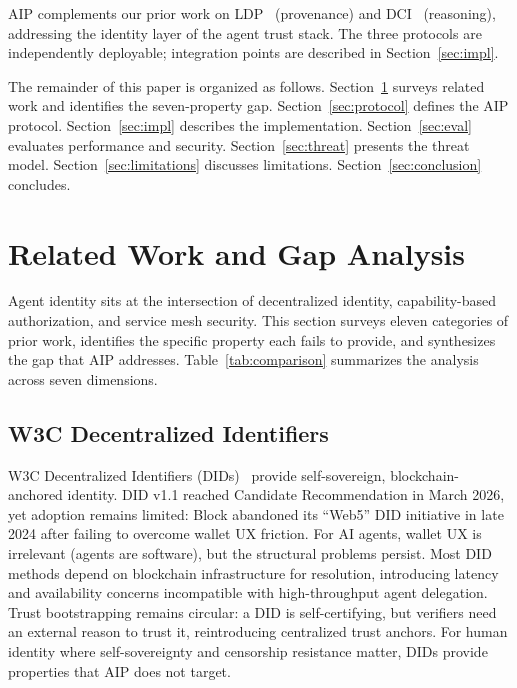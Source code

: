 \documentclass[11pt,a4paper]{article}
\newcommand{\aip}{\textsc{AIP}}
\newcommand{\ldp}{\textsc{LDP}}
\newcommand{\dci}{\textsc{DCI}}
\begin{document}
\aip{} complements our prior work on \ldp{}~\citep{prakash2025ldp} (provenance) and \dci{}~\citep{prakash2025dci} (reasoning), addressing the identity layer of the agent trust stack. The three protocols are independently deployable; integration points are described in Section~\ref{sec:impl}.

The remainder of this paper is organized as follows. Section~\ref{sec:related} surveys related work and identifies the seven-property gap. Section~\ref{sec:protocol} defines the \aip{} protocol. Section~\ref{sec:impl} describes the implementation. Section~\ref{sec:eval} evaluates performance and security. Section~\ref{sec:threat} presents the threat model. Section~\ref{sec:limitations} discusses limitations. Section~\ref{sec:conclusion} concludes.

\section{Related Work and Gap Analysis}
\label{sec:related}

Agent identity sits at the intersection of decentralized identity, capability-based authorization, and service mesh security. This section surveys eleven categories of prior work, identifies the specific property each fails to provide, and synthesizes the gap that \aip{} addresses. Table~\ref{tab:comparison} summarizes the analysis across seven dimensions.

\subsection{W3C Decentralized Identifiers}
\label{sec:did}

W3C Decentralized Identifiers (DIDs)~\citep{w3c2026did} provide self-sovereign, blockchain-anchored identity. DID v1.1 reached Candidate Recommendation in March 2026, yet adoption remains limited: Block abandoned its ``Web5'' DID initiative in late 2024 after failing to overcome wallet UX friction. For AI agents, wallet UX is irrelevant (agents are software), but the structural problems persist. Most DID methods depend on blockchain infrastructure for resolution, introducing latency and availability concerns incompatible with high-throughput agent delegation. Trust bootstrapping remains circular: a DID is self-certifying, but verifiers need an external reason to trust it, reintroducing centralized trust anchors. For human identity where self-sovereignty and censorship resistance matter, DIDs provide properties that \aip{} does not target.
\end{document}

